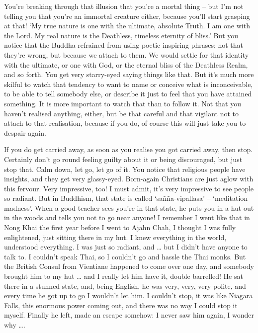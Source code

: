 You're breaking through that illusion that you're a mortal thing -- but I'm not telling you that you're an immortal creature either, because you'll start grasping at that! `My true nature is one with the ultimate, absolute Truth. I am one with the Lord. My real nature is the Deathless, timeless eternity of bliss.' But you notice that the Buddha refrained from using poetic inspiring phrases; not that they're wrong, but because we attach to them. We would settle for that identity with the ultimate, or one with God, or the eternal bliss of the Deathless Realm, and so forth. You get very starry-eyed saying things like that. But it's much more skilful to watch that tendency to want to name or conceive what is inconceivable, to be able to tell somebody else, or describe it just to feel that you have attained something. It is more important to watch that than to follow it. Not that you haven't realised anything, either, but be that careful and that vigilant not to attach to that realisation, because if you do, of course this will just take you to despair again.

If you do get carried away, as soon as you realise you got carried away, then stop. Certainly don't go round feeling guilty about it or being discouraged, but just stop that. Calm down, let go, let go of it. You notice that religious people have insights, and they get very glassy-eyed. Born-again Christians are just aglow with this fervour. Very impressive, too! I must admit, it's very impressive to see people so radiant. But in Buddhism, that state is called `sañña-vipallasa' -- `meditation madness'. When a good teacher sees you're in that state, he puts you in a hut out in the woods and tells you not to go near anyone! I remember I went like that in Nong Khai the first year before I went to Ajahn Chah, I thought I was fully enlightened, just sitting there in my hut. I knew everything in the world, understood everything. I was just so radiant, and \ldots{} but I didn't have anyone to talk to. I couldn't speak Thai, so I couldn't go and hassle the Thai monks. But the British Consul from Vientiane happened to come over one day, and somebody brought him to my hut \ldots{} and I really let him have it, double barrelled! He sat there in a stunned state, and, being English, he was very, very, very polite, and every time he got up to go I wouldn't let him. I couldn't stop, it was like Niagara Falls, this enormous power coming out, and there was no way I could stop it myself. Finally he left, made an escape somehow: I never saw him again, I wonder why \ldots{}.

